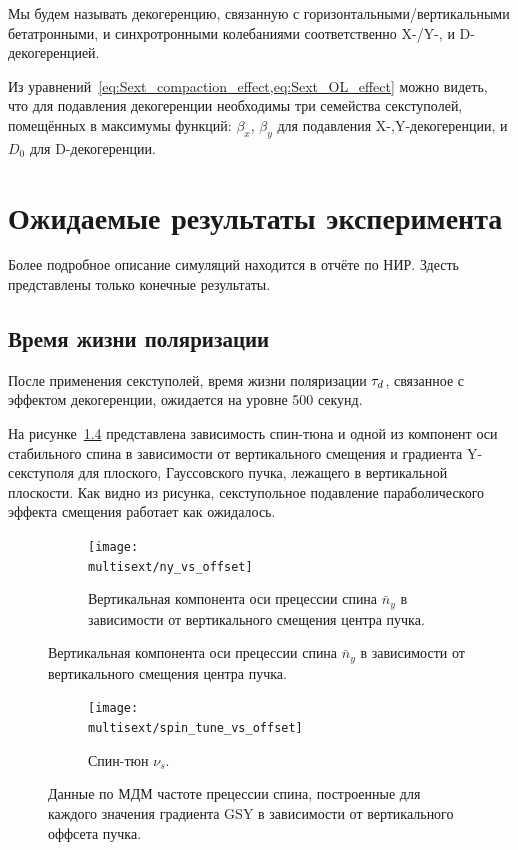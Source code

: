 \documentclass{report}
\newcommand{\home}{\string~}
\newcommand{\Artem}{\home/REPOS/COSYINF/img/Artem}
\newcommand{\multisext}{\Artem/multisext_test}
\begin{document}
Мы будем называть декогеренцию, связанную с
горизонтальными/вертикальными бетатронными, и синхротронными
колебаниями соответственно X-/Y-, и D-декогеренцией. 

Из уравнений~\cref{eq:Sext_compaction_effect,eq:Sext_OL_effect} можно
видеть, что для подавления декогеренции необходимы три семейства
секступолей, помещённых в максимумы функций: $\beta_x$, $\beta_y$ для подавления
X-,Y-декогеренции, и $D_0$ для D-декогеренции.


\chapter{Ожидаемые результаты эксперимента}
Более подробное описание симуляций находится в отчёте по НИР. Здесть представлены только конечные результаты.

\section{Время жизни поляризации}
После применения секступолей, время жизни поляризации $\tau_d$, связанное с эффектом декогеренции, ожидается на уровне 500 секунд.

На рисунке~\ref{fig:DECOH_GSY_variation} представлена зависимость спин-тюна и одной из компонент оси стабильного спина в зависимости от вертикального смещения и градиента Y-секступоля для плоского, Гауссовского пучка, лежащего в вертикальной плоскости. Как видно из рисунка, секступольное подавление параболического эффекта смещения работает как ожидалось.
\begin{figure}[H]
  \centering
  \begin{subfigure}[b]{\textwidth}
    \texttt{[image: \\multisext/ny\_vs\_offset]}
    \caption{Вертикальная компонента оси прецессии спина $\bar n_y$ в зависимости
      от вертикального смещения центра пучка.\label{fig:DECOH_full_ny}}
  \end{subfigure}
\end{figure}
\begin{figure}[H]\ContinuedFloat
  \centering
  \begin{subfigure}[b]{\textwidth}
    \texttt{[image: \\multisext/spin\_tune\_vs\_offset]}
    \caption{Спин-тюн $\nu_s$.\label{fig:SpinTune_vs_Y0_GSY}}
  \end{subfigure}
  \caption{Данные по МДМ частоте прецессии спина, построенные для каждого значения градиента GSY
    в зависимости от вертикального оффсета пучка.\label{fig:DECOH_GSY_variation}}
\end{figure}
\end{document}
